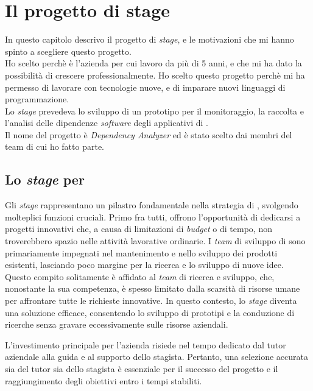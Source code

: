 \chapter{Il progetto di stage}
\label{cap:ilprogettodistage}

In questo capitolo descrivo il progetto di \textit{stage}, e le motivazioni che mi hanno spinto a scegliere questo progetto.\\
Ho scelto {\azienda} perchè è l'azienda per cui lavoro da più di 5 anni, e che mi ha dato la possibilità di crescere professionalmente.
Ho scelto questo progetto perchè mi ha permesso di lavorare con tecnologie nuove, e di imparare nuovi linguaggi di programmazione.\\
Lo \textit{stage} prevedeva lo sviluppo di un prototipo per il monitoraggio, la raccolta e l'analisi delle dipendenze \textit{software} degli applicativi di {\azienda}.\\
Il nome del progetto è \textit{Dependency Analyzer} ed è stato scelto dai membri del team di cui ho fatto parte.\\
\section{Lo \textit{stage} per \azienda}

Gli \textit{stage} rappresentano un pilastro fondamentale nella strategia di {\azienda}, svolgendo molteplici funzioni cruciali. 
Primo fra tutti, offrono l'opportunità di dedicarsi a progetti innovativi che, a causa di limitazioni di \textit{budget} o di tempo, 
non troverebbero spazio nelle attività lavorative ordinarie. I \textit{team} di sviluppo di {\azienda} sono primariamente impegnati 
nel mantenimento e nello sviluppo dei prodotti esistenti, lasciando poco margine per la ricerca e lo sviluppo di nuove idee. 
Questo compito solitamente è affidato al \textit{team} di ricerca e sviluppo, che, nonostante la sua competenza, è spesso limitato dalla scarsità 
di risorse umane per affrontare tutte le richieste innovative. In questo contesto, lo \textit{stage} diventa una soluzione efficace, 
consentendo lo sviluppo di prototipi e la conduzione di ricerche senza gravare eccessivamente sulle risorse aziendali.

L'investimento principale per l'azienda risiede nel tempo dedicato dal tutor aziendale alla guida e al supporto dello stagista. 
Pertanto, una selezione accurata sia del tutor sia dello stagista è essenziale per il successo del progetto e il raggiungimento 
degli obiettivi entro i tempi stabiliti.

